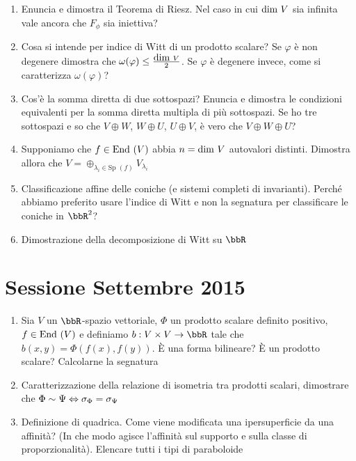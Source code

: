 \documentclass[a4paper,NoNotes,GeneralMath]{stdmdoc}
\begin{document}
\begin{enumerate}
		\item Enuncia e dimostra il Teorema di Riesz. Nel caso in cui $\mbox{dim } V$ sia infinita vale ancora che $F_\phi$ sia iniettiva?
		\item Cosa si intende per indice di Witt di un prodotto scalare? Se $\varphi$ è non degenere dimostra che $\omega(\varphi) \le \frac{\mbox{dim } V}{2}$. Se $\varphi$ è degenere invece, come si caratterizza $\omega(\varphi)$?
		\item Cos'è la somma diretta di due sottospazi? Enuncia e dimostra le condizioni equivalenti per la somma diretta multipla di più sottospazi. Se ho tre sottospazi e so che $V\oplus W$, $W\oplus U$, $U\oplus V$, è vero che $V\oplus W\oplus U$?
		\item Supponiamo che $f\in\mbox{End }(V)$ abbia $n = \mbox{dim } V$ autovalori distinti. Dimostra allora che $V = \oplus_{\lambda_i \in \text{Sp }(f)} V_{\lambda_i}$
		\item Classificazione affine delle coniche (e sistemi completi di invarianti). Perché abbiamo preferito usare l'indice di Witt e non la segnatura per classificare le coniche in $\bbR^2$?
		\item Dimostrazione della decomposizione di Witt su $\bbR$
	\end{enumerate}
	
	\section*{Sessione Settembre 2015}
	\begin{enumerate}
		\item Sia $V$ un $\bbR$-spazio vettoriale, $\Phi$ un prodotto scalare definito positivo, $f \in \mbox{End }(V)$ e definiamo $b: V \times V \rar \bbR$ tale che $b(x,y) = \Phi(f(x),f(y))$. È una forma bilineare? È un prodotto scalare? Calcolarne la segnatura
		\item Caratterizzazione della relazione di isometria tra prodotti scalari, dimostrare che $\Phi \sim \Psi \Leftrightarrow \sigma_\Phi =\sigma_\Psi$
		\item Definizione di quadrica. Come viene modificata una ipersuperficie da una affinità? (In che modo agisce l'affinità sul supporto e sulla classe di proporzionalità).  Elencare tutti i tipi di paraboloide
	\end{enumerate}
\end{document}
